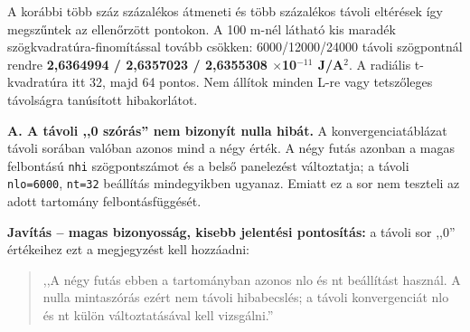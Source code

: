 \documentclass[10pt,a4paper]{article}
\begin{document}
{\par
\begin{center}\vspace{-2pt}\end{center}
\par
A korábbi több száz százalékos átmeneti és több százalékos távoli eltérések így megszűntek az ellenőrzött pontokon. A 100 m-nél látható kis maradék szögkvadratúra-finomítással tovább csökken: 6000/12000/24000 távoli szögpontnál rendre \textbf{2,6364994 / 2,6357023 / 2,6355308 $\times$10$^{-11}$ J/A$^2$}. A radiális t-kvadratúra itt 32, majd 64 pontos. Nem állítok minden L-re vagy tetszőleges távolságra tanúsított hibakorlátot.
\par
\vspace{1.5pt}\par\vspace{0.5pt}
\par
\textbf{A. A távoli ,,0 szórás'' nem bizonyít nulla hibát.} A konvergenciatáblázat távoli sorában valóban azonos mind a négy érték. A négy futás azonban a magas felbontású \texttt{nhi} szögpontszámot és a belső panelezést változtatja; a távoli \texttt{nlo=6000}, \texttt{nt=32} beállítás mindegyikben ugyanaz. Emiatt ez a sor nem teszteli az adott tartomány felbontásfüggését.
\par
\textbf{Javítás -- magas bizonyosság, kisebb jelentési pontosítás:} a távoli sor ,,0'' értékeihez ezt a megjegyzést kell hozzáadni:
\par
\begin{quote}\vspace{-3pt}
,,A négy futás ebben a tartományban azonos nlo és nt beállítást használ. A nulla mintaszórás ezért nem távoli hibabecslés; a távoli konvergenciát nlo és nt külön változtatásával kell vizsgálni.''


\end{quote}}
\end{document}
